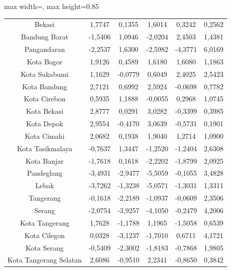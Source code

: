 \begin{table}[H]
\begin{adjustbox}{max width=\textwidth, max height=0.85\textheight}
\begin{tabular}{|c|c|c|c|c|c|}
Bekasi & 1,7747 & 0,1355 & 1,6014 & 0,3242 & 0,2562 \\
Bandung Barat & -1,5406 & 1,0946 & -2,0204 & 2,4503 & 1,4381 \\
Pangandaran & -2,2537 & 1,6300 & -2,5982 & -4,3771 & 6,0169 \\
Kota Bogor & 1,9126 & 0,4589 & 1,6180 & 1,6080 & 1,1863 \\
Kota Sukabumi & 1,1629 & -0,0779 & 0,6049 & 2,4025 & 2,5423 \\
Kota Bandung & 2,7121 & 0,6992 & 2,5924 & -0,0698 & 0,7782 \\
Kota Cirebon & 0,5935 & 1,1888 & -0,0055 & 0,2968 & 1,0745 \\
Kota Bekasi & 2,8777 & 0,0291 & 3,0282 & -0,3399 & 0,3985 \\
Kota Depok & 2,9554 & -0,4170 & 3,0639 & -0,5731 & 0,1901 \\
Kota Cimahi & 2,0682 & 0,1938 & 1,9040 & 1,2714 & 1,0900 \\
Kota Tasikmalaya & -0,7637 & 1,3447 & -1,2520 & -1,2404 & 2,6308 \\
Kota Banjar & -1,7618 & 0,1618 & -2,2202 & -1,8799 & 2,0925 \\
Pandeglang & -3,4931 & -2,9477 & -5,5059 & -0,1055 & 3,4828 \\
Lebak & -3,7262 & -1,3238 & -5,0571 & -1,3031 & 1,3311 \\
Tangerang & -0,1618 & -2,2189 & -1,0937 & -0,0609 & 2,3506 \\
Serang & -2,0754 & -3,9257 & -4,1050 & -0,2479 & 4,2006 \\
Kota Tangerang & 1,7628 & -1,1788 & 1,1965 & -1,5058 & 0,6539 \\
Kota Cilegon & 0,0328 & -3,1237 & -1,7010 & 0,6711 & 4,1721 \\
Kota Serang & -0,5409 & -2,3002 & -1,8183 & -0,7868 & 1,9805 \\
Kota Tangerang Selatan & 2,6086 & -0,9510 & 2,2341 & -0,8650 & 0,3842 \\
\hline
\end{tabular}
\end{adjustbox}
\end{table}